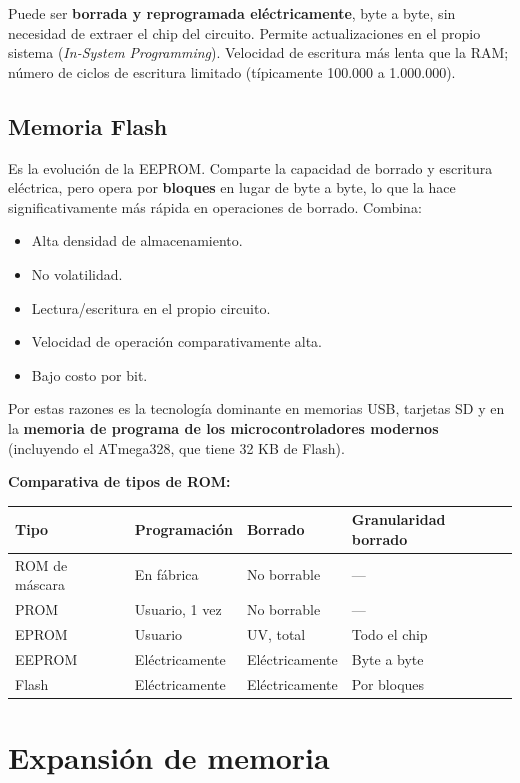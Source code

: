 Puede ser \textbf{borrada y reprogramada eléctricamente}, byte a byte, sin necesidad de extraer el chip del circuito. Permite actualizaciones en el propio sistema (\textit{In-System Programming}). Velocidad de escritura más lenta que la RAM; número de ciclos de escritura limitado (típicamente 100.000 a 1.000.000).

\subsection{Memoria Flash}

Es la evolución de la EEPROM. Comparte la capacidad de borrado y escritura eléctrica, pero opera por \textbf{bloques} en lugar de byte a byte, lo que la hace significativamente más rápida en operaciones de borrado. Combina:

\begin{itemize}
  \item Alta densidad de almacenamiento.
  \item No volatilidad.
  \item Lectura/escritura en el propio circuito.
  \item Velocidad de operación comparativamente alta.
  \item Bajo costo por bit.
\end{itemize}

Por estas razones es la tecnología dominante en memorias USB, tarjetas SD y en la \textbf{memoria de programa de los microcontroladores modernos} (incluyendo el ATmega328, que tiene 32 KB de Flash).

\textbf{Comparativa de tipos de ROM:}

\begin{table}[H]
\centering
\begin{tabular}{llll}
\toprule
Tipo & Programación & Borrado & Granularidad borrado \\
\midrule
ROM de máscara & En fábrica & No borrable & --- \\
PROM & Usuario, 1 vez & No borrable & --- \\
EPROM & Usuario & UV, total & Todo el chip \\
EEPROM & Eléctricamente & Eléctricamente & Byte a byte \\
Flash & Eléctricamente & Eléctricamente & Por bloques \\
\bottomrule
\end{tabular}
\end{table}

\section{Expansión de memoria}

